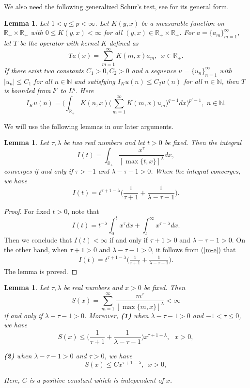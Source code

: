\documentclass[10pt]{amsart}
\newtheorem{lemma}[theorem]{Lemma}
\theoremstyle{definition}    %
\numberwithin{equation}{section}
\begin{document}
We also need the following generalized Schur’s test, see \cite{S} for its general form. 
\begin{lemma}\label{ll-3}
Let $1<q\leq p <\infty$. Let $K(y,x)$ be a measurable function on $\mathbb{R}_{+}\times \mathbb{R}_{+}$ with $0 \leq K(y,x)<\infty$ for all $(y,x)\in \mathbb{R}_{+}\times \mathbb{R}_{+}$. For $a=\{a_m\}_{m=1}^{\infty}$, let $T$ be the operator with kernel $K$ defined as
$$Ta(x)=\sum_{m=1}^{\infty}K(m,x)a_m,\,\,\, x\in \mathbb{R}_{+}.$$
If there exist two constants $C_1>0, C_2>0$ and a sequence $u=\{u_n\}_{n=1}^{\infty}$ with $|u_n| \leq C_1$ for all $n\in \mathbb{N}$ and satisfying $I_{K}u(n) \leq C_2 u(n)$ for all $n\in \mathbb{N}$, then $T$ is bounded from $l^{p}$ to $L^{q}.$ Here
$$I_{K}u(n)=\Big(\int_{\mathbb{R}_{+}}K(n,x)\Big(\sum_{m=1}^{\infty}K(m,x)u_m\Big)^{q-1}dx\Big)^{p'-1},\,\, n\in \mathbb{N}.$$
\end{lemma}

We will use the following lemmas in our later arguments.

\begin{lemma}\label{ll-4}Let $\tau, \lambda$ be two real numbers and let $t>0$ be fixed. Then the integral 
$$I(t)=\int_{\mathbb{R}_{+}}\frac{x^{\tau}}{[\max\{t, x\}]^{\lambda}}dx,$$
converges if and only if $\tau>-1$ and $\lambda-\tau-1>0$. When the integral converges, we have
$$I(t)=t^{\tau+1-\lambda}\Big(\frac{1}{\tau+1}+\frac{1}{\lambda-\tau-1}\Big).$$ 
\end{lemma}

\begin{proof}
For fixed $t>0$, note that 
\begin{equation}\label{m-e}
I(t)=t^{-\lambda}\int_{0}^{t}x^{\tau}dx+\int_{t}^{\infty}x^{\tau-\lambda}dx.
\end{equation}
Then we conclude that $I(t)<\infty$ if and only if $\tau+1>0$ and $\lambda-\tau-1>0$. On the other hand, when $\tau+1>0$ and $\lambda-\tau-1>0$, it follows from (\ref{m-e}) that 
\begin{eqnarray} 
I(t)=t^{\tau+1-\lambda}\Big(\frac{1}{\tau+1}+\frac{1}{\lambda-\tau-1}\Big).\nonumber 
\end{eqnarray} 
The lemma is proved. 
\end{proof}

\begin{lemma}\label{ll-5}Let $\tau, \lambda$ be real numbers and $x>0$ be fixed. Then 
 $$S(x)=\sum_{m=1}^{\infty}\frac{m^{\tau}}{[\max\{m,x\}]^{\lambda}}<\infty$$
 if and only if $\lambda-\tau-1>0$. Moreover, {\bf (1)} when $\lambda-\tau-1>0$ and $-1<\tau\leq 0$, we have
$$S(x)\leq \Big(\frac{1}{\tau+1}+\frac{1}{\lambda-\tau-1}\Big)x^{\tau+1-\lambda},\,\,\,\, x>0,$$

{\bf (2)}
when $\lambda-\tau-1>0$ and $\tau>0$, we have
$$S(x)\leq C x^{\tau+1-\lambda},\,\,\, x>0,$$


Here, $C$ is a positive constant which is independent of $x$. 
\end{lemma}
\end{document}
